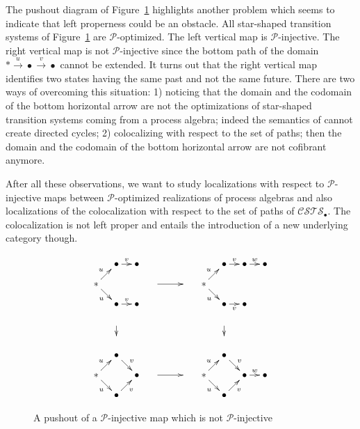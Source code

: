 \documentclass[a4paper,12pt]{amsart}
\begin{document}
The pushout diagram of Figure~\ref{left-proper-pb} highlights another
problem which seems to indicate that left properness could be an
obstacle. All star-shaped transition systems of
Figure~\ref{left-proper-pb} are $\mathcal{P}$-optimized. The left
vertical map is $\mathcal{P}$-injective. The right vertical map is not
$\mathcal{P}$-injective since the bottom path of the domain
$*\stackrel{u}\to \bullet \stackrel{v}\to \bullet$ cannot be extended.
It turns out that the right vertical map identifies two states having
the same past and not the same future.  There are two ways of
overcoming this situation: 1) noticing that the domain and the
codomain of the bottom horizontal arrow are not the optimizations of
star-shaped transition systems coming from a process algebra; indeed
the semantics of \cite{hdts} cannot create directed cycles; 2)
colocalizing with respect to the set of paths; then the domain and the
codomain of the bottom horizontal arrow are not cofibrant anymore.

After all these observations, we want to study localizations with
respect to $\mathcal{P}$-injective maps between
$\mathcal{P}$-optimized realizations of process algebras and also
localizations of the colocalization with respect to the set of paths
of ${\mathcal{C\!S\!T\!S}}_\bullet$. The colocalization is not left proper and entails
the introduction of a new underlying category though.

\begin{figure}
\[
\xymatrix@C=1em@R=1em
{
&\bullet {\ar@{->}[r]^-{{v}}} & \bullet &&&& &\bullet   {\ar@{->}[r]^-{{v}}} & \bullet {\ar@{->}[r]^-{{w}}} & \bullet           \\
{*} \ar@{->}[ru]^-{u}\ar@{->}[rd]_-{u}&&&{\ar@{->}[rr]^-{{}}}&&&{*} \ar@{->}[ru]^-{u}\ar@{->}[rd]_-{u}\\
&\bullet {\ar@{->}[r]^-{{v}}} & \bullet && &&   &\bullet   \ar@{->}[r]_-{v} & \bullet    \\
& {\ar@{->}[d]_-{{}}}&&&&&& {\ar@{->}[d]_-{{}}}\\
&&&&&&&\\
&\bullet \ar@{->}[rd]^-{v}&&&&&&\bullet \ar@{->}[rd]^-{v}\\
{*} \ar@{->}[ru]^-{u}\ar@{->}[rd]_-{u}&& \bullet& {\ar@{->}[rr]^-{{}}}&&&{*} \ar@{->}[ru]^-{u}\ar@{->}[rd]_-{u}&& \bullet {\ar@{->}[r]^-{{w}}} &\bullet \\
&\bullet \ar@{->}[ru]_-{v}&&&&&&\bullet \ar@{->}[ru]_-{v}\\
}
\]
\caption{A pushout of a $\mathcal{P}$-injective map which is not $\mathcal{P}$-injective}
\label{left-proper-pb}
\end{figure}
\end{document}

